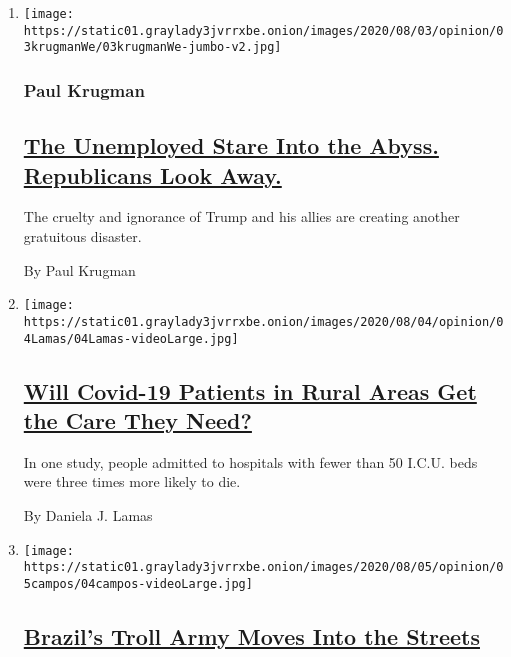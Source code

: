 \begin{enumerate}
\def\labelenumi{\arabic{enumi}.}
\item
  \texttt{[image: https://static01.graylady3jvrrxbe.onion/images/2020/08/03/opinion/03krugmanWe/03krugmanWe-jumbo-v2.jpg]}

  \hypertarget{paul-krugman}{%
  \subsubsection{Paul Krugman}\label{paul-krugman}}

  \hypertarget{the-unemployed-stare-into-the-abyss-republicans-look-away}{%
  \subsection{\texorpdfstring{\href{/2020/08/03/opinion/republicans-unemployed-coronavirus.html}{The
  Unemployed Stare Into the Abyss. Republicans Look
  Away.}}{The Unemployed Stare Into the Abyss. Republicans Look Away.}}\label{the-unemployed-stare-into-the-abyss-republicans-look-away}}

  The cruelty and ignorance of Trump and his allies are creating another
  gratuitous disaster.

  By Paul Krugman
\item
  \texttt{[image: https://static01.graylady3jvrrxbe.onion/images/2020/08/04/opinion/04Lamas/04Lamas-videoLarge.jpg]}

  \hypertarget{will-covid-19-patients-in-rural-areas-get-the-care-they-need}{%
  \subsection{\texorpdfstring{\href{/2020/08/04/opinion/covid-rural-hospitals.html}{Will
  Covid-19 Patients in Rural Areas Get the Care They
  Need?}}{Will Covid-19 Patients in Rural Areas Get the Care They Need?}}\label{will-covid-19-patients-in-rural-areas-get-the-care-they-need}}

  In one study, people admitted to hospitals with fewer than 50 I.C.U.
  beds were three times more likely to die.

  By Daniela J. Lamas
\item
  \texttt{[image: https://static01.graylady3jvrrxbe.onion/images/2020/08/05/opinion/05campos/04campos-videoLarge.jpg]}

  \hypertarget{brazils-troll-army-moves-into-the-streets}{%
  \subsection{\texorpdfstring{\href{/2020/08/04/opinion/bolsonaro-office-of-hate-brazil.html}{Brazil's
  Troll Army Moves Into the
  Streets}}{Brazil's Troll Army Moves Into the Streets}}\label{brazils-troll-army-moves-into-the-streets}}


\end{enumerate}

